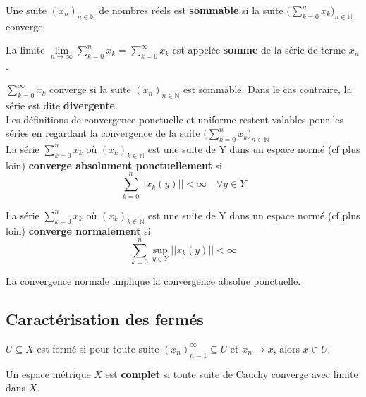 \begin{definition}
    Une suite $(x_n)_{n\in\mathbb{N}}$ de nombres réels est \textbf{sommable} si la suite $\Big(\sum \limits_{k=0}^n x_k\Big)_{n\in\mathbb{N}}$ converge.
\end{definition}

\begin{definition}
    La limite $\lim \limits_{n\to\infty}\sum \limits_{k=0}^n x_k = \sum \limits_{k=0}^\infty x_k$ est appelée \textbf{somme} de la série de terme $x_n$.
\end{definition}    

\begin{definition}
    $\sum \limits_{k=0}^\infty x_k$ converge si la suite $(x_n)_{n\in\mathbb{N}}$ est sommable. Dans le cas contraire, la série est dite \textbf{divergente}.\\
    
    Les définitions de convergence ponctuelle et uniforme restent valables pour les séries en regardant la convergence de la suite $\Big(\sum \limits_{k=0}^n x_k\Big)_{n\in\mathbb{N}}$\\
    
    La série $\sum \limits_{k=0}^n x_k$ où $(x_k)_{k\in\mathbb{N}}$ est une suite de Y dans un espace normé (cf plus loin) \textbf{converge absolument ponctuellement} si
    \begin{equation*}
         \sum \limits_{k=0}^n ||x_k(y)|| < \infty \quad \forall y \in Y
    \end{equation*}
    
    La série $\sum \limits_{k=0}^n x_k$ où $(x_k)_{k\in\mathbb{N}}$ est une suite de Y dans un espace normé (cf plus loin) \textbf{converge normalement} si
    \begin{equation*}
         \sum \limits_{k=0}^n \sup \limits_{y \in Y}||x_k(y)|| < \infty
    \end{equation*}
    
    La convergence normale implique la convergence absolue ponctuelle.
\end{definition}

\subsection{Caractérisation des fermés}

$U\subseteq X$ est fermé si pour toute suite $(x_n)_{n=1}^\infty\subseteq U$ et $x_n\rightarrow x$, alors $x\in U$.

\begin{definition}
    Un espace métrique $X$ est \textbf{complet} si toute suite de Cauchy converge avec limite dans $X$.
\end{definition}

